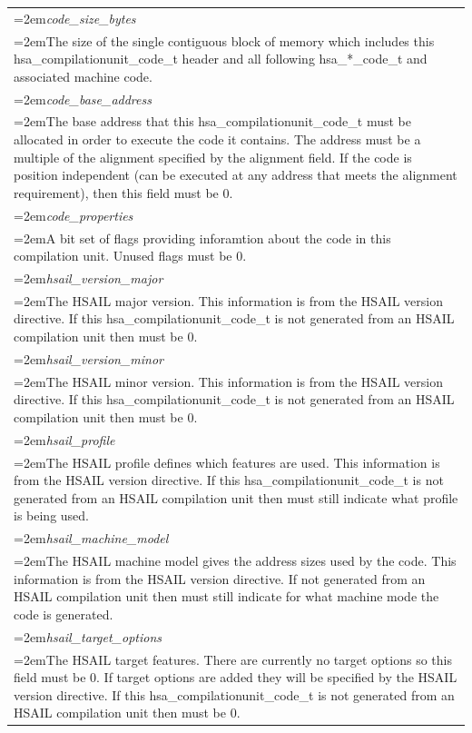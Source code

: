 \documentclass{book}
\newcommand{\hsaarg}[1]{\textit{#1}}
\begin{document}
\begin{appendices}
\begin{longtable}{@{}>{\hangindent=2em}p{\textwidth}}
\hsaarg{code\_size\_bytes}\\\hspace{2em}The size of the single contiguous block of memory which includes this hsa\_compilationunit\_code\_t header and all following hsa\_*\_code\_t and associated machine code.\\[2mm]
\hsaarg{code\_base\_address}\\\hspace{2em}The base address that this hsa\_compilationunit\_code\_t must be allocated in order to execute the code it contains. The address must be a multiple of the alignment specified by the alignment field. If the code is position independent (can be executed at any address that meets the alignment requirement), then this field must be 0.\\[2mm]
\hsaarg{code\_properties}\\\hspace{2em}A bit set of flags providing inforamtion about the code in this compilation unit. Unused flags must be 0.\\[2mm]
\hsaarg{hsail\_version\_major}\\\hspace{2em}The HSAIL major version. This information is from the HSAIL version directive. If this hsa\_compilationunit\_code\_t is not generated from an HSAIL compilation unit then must be 0.\\[2mm]
\hsaarg{hsail\_version\_minor}\\\hspace{2em}The HSAIL minor version. This information is from the HSAIL version directive. If this hsa\_compilationunit\_code\_t is not generated from an HSAIL compilation unit then must be 0.\\[2mm]
\hsaarg{hsail\_profile}\\\hspace{2em}The HSAIL profile defines which features are used. This information is from the HSAIL version directive. If this hsa\_compilationunit\_code\_t is not generated from an HSAIL compilation unit then must still indicate what profile is being used.\\[2mm]
\hsaarg{hsail\_machine\_model}\\\hspace{2em}The HSAIL machine model gives the address sizes used by the code. This information is from the HSAIL version directive. If not generated from an HSAIL compilation unit then must still indicate for what machine mode the code is generated.\\[2mm]
\hsaarg{hsail\_target\_options}\\\hspace{2em}The HSAIL target features. There are currently no target options so this field must be 0. If target options are added they will be specified by the HSAIL version directive. If this hsa\_compilationunit\_code\_t is not generated from an HSAIL compilation unit then must be 0.
\end{longtable}


\end{appendices}
\end{document}
